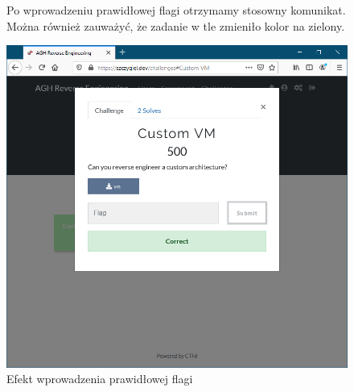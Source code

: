 \documentclass[polish,12pt]{aghthesis}
\begin{document}
\begin{figure}[ht]
    Po wprowadzeniu prawidłowej flagi otrzymamy stosowny komunikat.
    Można również zauważyć, że zadanie w tle zmieniło kolor na zielony.

    \vspace{1cm}

    \centering
    \includegraphics[width=14cm]{szczygiel_dev_correct}
    \caption{Efekt wprowadzenia prawidłowej flagi}
    \label{fig:szczygiel_dev_correct}
\end{figure}
\end{document}
